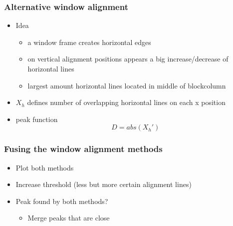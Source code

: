 \documentclass{beamer}
\begin{document}
\frame
{
	\frametitle{Alternative window alignment}
	\begin{itemize}
	\item <+-| alert@+> Idea
		\begin{itemize}
		\item <+-| alert@+> a window frame creates horizontal edges
		\item <+-| alert@+> on vertical alignment positions appears a big increase/decrease of horizontal lines 
		\item <+-| alert@+> largest amount horizontal lines located in middle of
		blockcolumn
		\end{itemize}
	\item <+-| alert@+> $X_{h}$ defines number of overlapping horizontal lines on each x position
	\item <+-| alert@+> peak function \[D = abs( X_{h}')\]
	\end{itemize}
}

\frame
{
}




\frame
{
	\frametitle{Fusing the window alignment methods}
	\begin{itemize}
	\item <+-| alert@+> Plot both methods
	\item <+-| alert@+> Increase threshold (less but more certain alignment lines)
	\item <+-| alert@+> Peak found by both methods?
		\begin{itemize}
		\item <+-| alert@+> Merge peaks that are close
		\end{itemize}
	\end{itemize}
}

\frame
{
}
\end{document}
